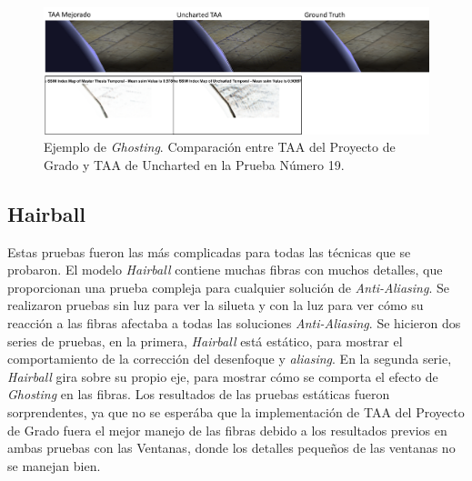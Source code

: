 \documentclass[pregrado]{tesis-usb} %
\begin{document}
\begin{figure}[!htb]
	\centering
	\includegraphics[scale=0.5]{images/results/sphere_ghosting.png}
	\caption{Ejemplo de \textit{Ghosting}. Comparación  entre TAA del Proyecto de Grado y TAA de Uncharted en la Prueba Número 19.}\label{fig:sphere_ghosting}
\end{figure}

\FloatBarrier

\subsection{Hairball}
Estas pruebas fueron las más complicadas para todas las técnicas que se probaron. El modelo \textit{Hairball} contiene muchas fibras con muchos detalles, que proporcionan una prueba compleja para cualquier solución de \textit{Anti-Aliasing}. Se realizaron pruebas sin luz para ver la silueta y con la luz para ver cómo su reacción a las fibras afectaba a todas las soluciones \textit{Anti-Aliasing}. Se hicieron dos series de pruebas, en la primera, \textit{Hairball} está estático, para mostrar el comportamiento de la corrección del desenfoque y \textit{aliasing}. En la segunda serie, \textit{Hairball} gira sobre su propio eje, para mostrar cómo se comporta el efecto de \textit{Ghosting} en las fibras. Los resultados de las pruebas estáticas fueron sorprendentes, ya que no se esperába que la implementación de TAA del Proyecto de Grado fuera el mejor manejo de las fibras debido a los resultados previos en ambas pruebas con las Ventanas, donde los detalles pequeños de las ventanas no se manejan bien.
\end{document}
